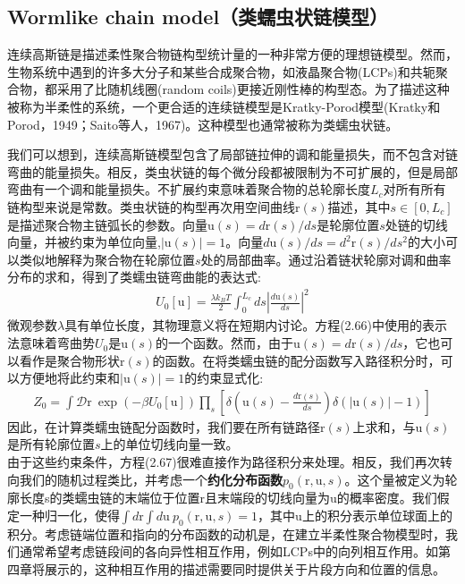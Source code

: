 \subsection{Wormlike chain model（类蠕虫状链模型）}

连续高斯链是描述柔性聚合物链构型统计量的一种非常方便的理想链模型。然而，生物系统中遇到的许多大分子和某些合成聚合物，如液晶聚合物(LCPs)和共轭聚合物，都采用了比随机线圈(random coils)更接近刚性棒的构型态。为了描述这种被称为半柔性的系统，一个更合适的连续链模型是Kratky-Porod模型(Kratky和Porod，1949；Saito等人，1967)。这种模型也通常被称为类蠕虫状链。

我们可以想到，连续高斯链模型包含了局部链拉伸的调和能量损失，而不包含对链弯曲的能量损失。相反，类虫状链的每个微分段都被限制为不可扩展的，但是局部弯曲有一个调和能量损失。不扩展约束意味着聚合物的总轮廓长度$L_c$对所有所有链构型来说是常数。类虫状链的构型再次用空间曲线$\mathrm{r}(s)$描述，其中$s\in [0,L_c]$是描述聚合物主链弧长的参数。向量$\mathrm{u}(s)=d\mathrm{r}(s)/ds$是轮廓位置$s$处链的切线向量，并被约束为单位向量,$|\mathrm{u}(s)| =1$。向量$d\mathrm{u}(s)/ds=d^2\mathrm{r}(s)/ds^2$的大小可以类似地解释为聚合物在轮廓位置$s$处的局部曲率。通过沿着链状轮廓对调和曲率分布的求和，得到了类蠕虫链弯曲能的表达式:\\
\begin{gather}
	U_0[\mathrm{u}]=\frac{\lambda k_B T}{2}\int_{0}^{L_c}ds|\frac{d\mathrm{u}(s)}{ds}|^2
\end{gather}
微观参数$\lambda$具有单位长度，其物理意义将在短期内讨论。方程(2.66)中使用的表示法意味着弯曲势$U_0$是$\mathrm{u}(s)$的一个函数。然而，由于$\mathrm{u}(s)=d\mathrm{r}(s)/ds$，它也可以看作是聚合物形状$\mathrm{r}(s)$的函数。在将类蠕虫链的配分函数写入路径积分时，可以方便地将此约束和$|\mathrm{u}(s)|=1$的约束显式化:\\
\begin{gather}
	Z_0=\int \mathcal{D} \mathrm{r}\ \exp (-\beta U_0[\mathrm{u}])\prod_s\left[\delta\left(\mathrm{u}(s)-\frac{d\mathrm{r}(s)}{ds}\right)\delta(|\mathrm{u}(s)|-1)\right]
\end{gather}
因此，在计算类蠕虫链配分函数时，我们要在所有链路径$\mathrm{r}(s)$上求和，与$\mathrm{u}(s)$是所有轮廓位置$s$上的单位切线向量一致。\\

由于这些约束条件，方程(2.67)很难直接作为路径积分来处理。相反，我们再次转向我们的随机过程类比，并考虑一个\textbf{约化分布函数}$p_0(\mathrm{r},\mathrm{u},s)$。这个量被定义为轮廓长度s的类蠕虫链的末端位于位置$\mathrm{r}$且末端段的切线向量为$\mathrm{u}$的概率密度。我们假定一种归一化，使得$\int d\mathrm{r}\int d\mathrm{u} \ p_0(\mathrm{r},\mathrm{u},s)=1$，其中$\mathrm{u}$上的积分表示单位球面上的积分。考虑链端位置和指向的分布函数的动机是，在建立半柔性聚合物模型时，我们通常希望考虑链段间的各向异性相互作用，例如LCPs中的向列相互作用。如第四章将展示的，这种相互作用的描述需要同时提供关于片段方向和位置的信息。

